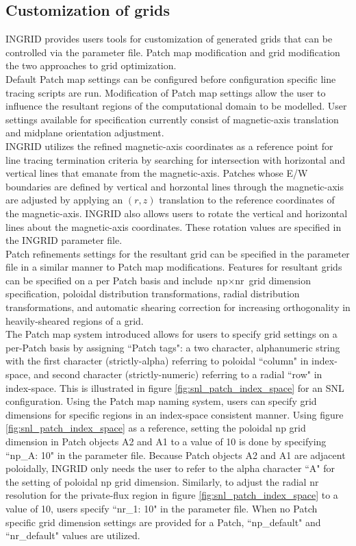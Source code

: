 \subsection{Customization of grids}
INGRID provides users tools for customization of generated grids that can be controlled via the parameter file. Patch map modification and grid modification the two approaches to grid optimization.\\ \indent
Default Patch map settings can be configured before configuration specific line tracing scripts are run. Modification of Patch map settings allow the user to influence the resultant regions of the computational domain to be modelled. User settings available for specification currently consist of magnetic-axis translation and midplane orientation adjustment.\\ \indent
INGRID utilizes the refined magnetic-axis coordinates as a reference point for line tracing termination criteria by searching for intersection with horizontal and vertical lines that emanate from the magnetic-axis. Patches whose E/W boundaries are defined by vertical and horzontal lines through the magnetic-axis are adjusted by applying an $(r,z)$ translation to the reference coordinates of the magnetic-axis. INGRID also allows users to rotate the vertical and horizontal lines about the magnetic-axis coordinates. These rotation values are specified in the INGRID parameter file.\\ \indent
Patch refinements settings for the resultant grid can be specified in the parameter file in a similar manner to Patch map modifications. Features for resultant grids can be specified on a per Patch basis and include $\text{np}\times\text{nr}$ grid dimension specification, poloidal distribution transformations, radial distribution transformations, and automatic shearing correction for increasing orthogonality in heavily-sheared regions of a grid.\\ \indent
The Patch map system introduced allows for users to specify grid settings on a per-Patch basis by assigning ``Patch tags": a two character, alphanumeric string with the first character (strictly-alpha) referring to poloidal ``column" in index-space, and second character (strictly-numeric) referring to a radial ``row" in index-space. This is illustrated in figure \ref{fig:snl_patch_index_space} for an SNL configuration. Using the Patch map naming system, users can specify grid dimensions for specific regions in an index-space consistent manner. Using figure \ref{fig:snl_patch_index_space} as a reference, setting the poloidal np grid dimension in Patch objects A2 and A1 to a value of 10 is done by specifying ``np\_A: 10" in the parameter file. Because Patch objects A2 and A1 are adjacent poloidally, INGRID only needs the user to refer to the alpha character ``A" for the setting of poloidal np grid dimension. Similarly, to adjust the radial nr resolution for the private-flux region in figure \ref{fig:snl_patch_index_space} to a value of 10, users specify ``nr\_1: 10" in the parameter file. When no Patch specific grid dimension settings are provided for a Patch, ``np\_default" and ``nr\_default" values are utilized.\\ \indent
